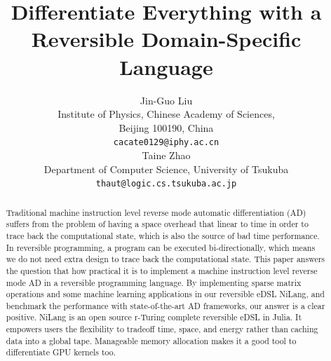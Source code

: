 \documentclass{article}
\newcommand{\<}{\langle}
\renewcommand{\>}{\rangle}
\theoremstyle{definition}\newtheorem{definition}{\textit{Definition}}
\begin{document}
\title{Differentiate Everything with a Reversible Domain-Specific Language}

\author{Jin-Guo Liu\\
Institute of Physics, Chinese Academy of Sciences,\\Beijing 100190, China\\
\texttt{cacate0129@iphy.ac.cn}\\
\And
Taine Zhao\\
Department of Computer Science, University of Tsukuba\\
\texttt{thaut@logic.cs.tsukuba.ac.jp}\\
}



\maketitle

\begin{abstract}
    Traditional machine instruction level reverse mode automatic differentiation (AD) suffers from the problem of having a space overhead that linear to time in order to trace back the computational state, which is also the source of bad time performance. In reversible programming, a program can be executed bi-directionally, which means we do not need extra design to trace back the computational state. This paper answers the question that how practical it is to implement a machine instruction level reverse mode AD in a reversible programming language. By implementing sparse matrix operations and some machine learning applications in our reversible eDSL NiLang, and benchmark the performance with state-of-the-art AD frameworks, our answer is a clear positive.
    NiLang is an open source r-Turing complete reversible eDSL in Julia. It empowers users the flexibility to tradeoff time, space, and energy rather than caching data into a global tape. Manageable memory allocation makes it a good tool to differentiate GPU kernels too.
\end{abstract}
\end{document}
